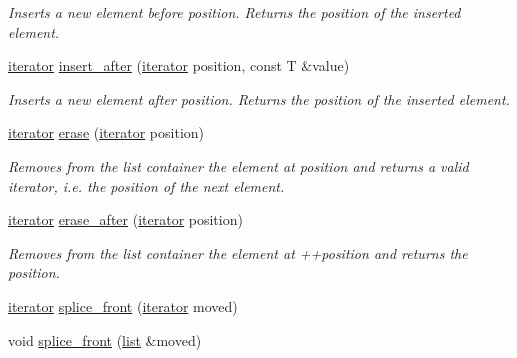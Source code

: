 \begin{DoxyCompactItemize}
\begin{DoxyCompactList}\small\item\em Inserts a new element before {\itshape position}. Returns the position of the inserted element. \end{DoxyCompactList}\item 
\hypertarget{classofeli_1_1list_a89cdc246b5f3b431d18e148d3dcad54e}{\hyperlink{classofeli_1_1list_1_1iterator}{iterator} \hyperlink{classofeli_1_1list_a89cdc246b5f3b431d18e148d3dcad54e}{insert\-\_\-after} (\hyperlink{classofeli_1_1list_1_1iterator}{iterator} position, const T \&value)}\label{classofeli_1_1list_a89cdc246b5f3b431d18e148d3dcad54e}

\begin{DoxyCompactList}\small\item\em Inserts a new element after {\itshape position}. Returns the position of the inserted element. \end{DoxyCompactList}\item 
\hypertarget{classofeli_1_1list_ae160d4ea7224becad437add3b1d594e4}{\hyperlink{classofeli_1_1list_1_1iterator}{iterator} \hyperlink{classofeli_1_1list_ae160d4ea7224becad437add3b1d594e4}{erase} (\hyperlink{classofeli_1_1list_1_1iterator}{iterator} position)}\label{classofeli_1_1list_ae160d4ea7224becad437add3b1d594e4}

\begin{DoxyCompactList}\small\item\em Removes from the list container the element at {\itshape position} and returns a valid iterator, i.\-e. the position of the next element. \end{DoxyCompactList}\item 
\hypertarget{classofeli_1_1list_a5f61ba4f2a9f7d67c4737baa9096386c}{\hyperlink{classofeli_1_1list_1_1iterator}{iterator} \hyperlink{classofeli_1_1list_a5f61ba4f2a9f7d67c4737baa9096386c}{erase\-\_\-after} (\hyperlink{classofeli_1_1list_1_1iterator}{iterator} position)}\label{classofeli_1_1list_a5f61ba4f2a9f7d67c4737baa9096386c}

\begin{DoxyCompactList}\small\item\em Removes from the list container the element at {\itshape ++position} and returns the position. \end{DoxyCompactList}\item 
\hyperlink{classofeli_1_1list_1_1iterator}{iterator} \hyperlink{classofeli_1_1list_af38ebb4b33ce7f5518b78eb1e8ae3464}{splice\-\_\-front} (\hyperlink{classofeli_1_1list_1_1iterator}{iterator} moved)
\item 
\hypertarget{classofeli_1_1list_a92338c30de397c0ac7bf224280c5607e}{void \hyperlink{classofeli_1_1list_a92338c30de397c0ac7bf224280c5607e}{splice\-\_\-front} (\hyperlink{classofeli_1_1list}{list} \&moved)}\label{classofeli_1_1list_a92338c30de397c0ac7bf224280c5607e}


\end{DoxyCompactItemize}
